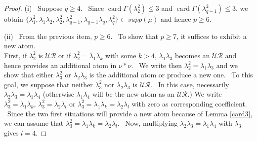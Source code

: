 \documentclass[12pt]{amsart}
\newcommand{\card}{\operatorname{card}}
\begin{document}
\begin{proof}
(i) \ Suppose  $q\ge 4$. \ Since  $\card\Gamma(\lambda^2_2)\le 3$ and $\card\Gamma(\lambda_{q-1}^2)\le 3$, we obtain 
$\{\lambda_1^2,\lambda_1\lambda_2,\lambda_2^2, \lambda_{q-1}^2,\lambda_{q-1}\lambda_q,\lambda_q^2\} \subset supp(\mu) $ and hence $p\ge 6$.

(ii) \ From the previous item, $p\ge 6$. \ To show that  $p\ge 7$, it suffices to exhibit a new atom.\\
First, if  $\lambda_2^2$ is $\mathcal{UR}$ or if $\lambda_2^2=\lambda_1\lambda_k$ with some $k>4$, $\lambda_1\lambda_3$  becomes an  $\mathcal{UR}$ and hence provides an additional atom in $\nu*\nu$. \ We write then
  $\lambda_2^2=\lambda_1\lambda_3$ and we show that either $\lambda_3^2$ or $\lambda_2\lambda_3$ is the additional atom or produce a new one. \ To this goal, we suppose that neither $\lambda_3^2$ nor  $\lambda_2\lambda_3$ is $\mathcal{UR}$. \ In this case, necessarily $\lambda_2\lambda_3=\lambda_1\lambda_4$ (otherwise   $\lambda_1\lambda_4$ will be the new atom as an $\mathcal{UR}$.)
We write $\lambda_3^2=\lambda_1\lambda_k$, $\lambda_3^2=\lambda_2\lambda_l$ or  $\lambda_3^2=\lambda_1\lambda_k=\lambda_2\lambda_l$ with zero as  corresponding coefficient. \ Since the two first situations will provide a new atom because of Lemma \ref{card3}, we can assume  that $\lambda_3^2=\lambda_1\lambda_k=\lambda_2\lambda_l$. \ Now, multiplying $\lambda_2\lambda_3=\lambda_1\lambda_4$   with $\lambda_3$ gives $l=4$. 


\end{proof}
\end{document}
